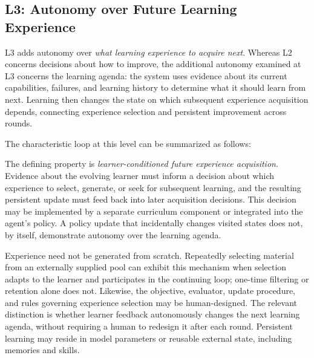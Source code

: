 

\subsection{L3: Autonomy over Future Learning Experience}
\label{sec:l3-experience-autonomy}

L3 adds autonomy over \emph{what learning experience to acquire next}.
Whereas L2 concerns decisions about how to improve, the additional autonomy
examined at L3 concerns the learning agenda: the system uses evidence about
its current capabilities, failures, and learning history to determine what
it should learn from next.
Learning then changes the state on which subsequent experience acquisition
depends, connecting experience selection and persistent improvement across
rounds.

The characteristic loop at this level can be summarized as follows:

\begin{center}
\end{center}

The defining property is \emph{learner-conditioned future experience
acquisition}.
Evidence about the evolving learner must inform a decision about which
experience to select, generate, or seek for subsequent learning, and the
resulting persistent update must feed back into later acquisition decisions.
This decision may be implemented by a separate curriculum component or
integrated into the agent's policy.
A policy update that incidentally changes visited states does not, by itself,
demonstrate autonomy over the learning agenda.

Experience need not be generated from scratch.
Repeatedly selecting material from an externally supplied pool can exhibit
this mechanism when selection adapts to the learner and participates in the
continuing loop; one-time filtering or retention alone does not.
Likewise, the objective, evaluator, update procedure, and rules governing
experience selection may be human-designed.
The relevant distinction is whether learner feedback autonomously changes
the next learning agenda, without requiring a human to redesign it after
each round.
Persistent learning may reside in model parameters or reusable external
state, including memories and skills.

